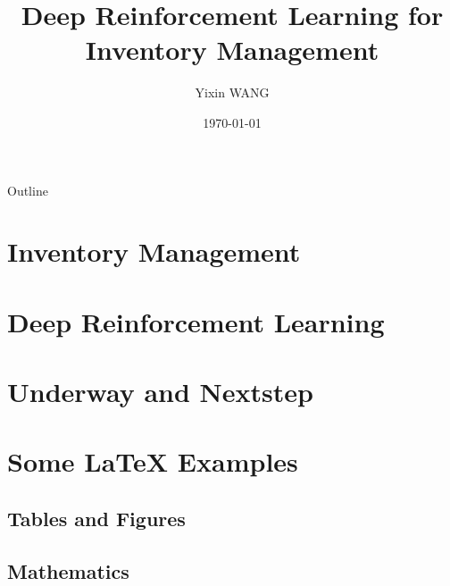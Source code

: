 \documentclass{beamer}
\title[DRL4IM]{Deep Reinforcement Learning for Inventory Management}
\author{Yixin WANG}
\institute[]{
  \normalsize \textit{wangyixin2020@email.szu.edu.cn}\\
  \bigskip\normalsize CD406, PolyU, Hong Kong
}
\date{\today}
\begin{document}
\begin{frame}
  \titlepage
\end{frame}

\begin{frame}{Outline}
 \tableofcontents
\end{frame}

\section{Inventory Management}


\section{Deep Reinforcement Learning}


\section{Underway and Nextstep}


\section{Some \LaTeX{} Examples}
\subsection{Tables and Figures}


\subsection{Mathematics}

\end{document}
